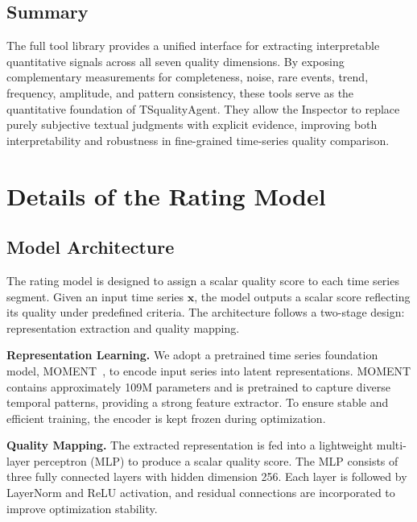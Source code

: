 \documentclass{article}
\begin{document}
\subsection{Summary}

The full tool library provides a unified interface for extracting interpretable quantitative signals across all seven quality dimensions. By exposing complementary measurements for completeness, noise, rare events, trend, frequency, amplitude, and pattern consistency, these tools serve as the quantitative foundation of TSqualityAgent. They allow the Inspector to replace purely subjective textual judgments with explicit evidence, improving both interpretability and robustness in fine-grained time-series quality comparison.



\section{Details of the Rating Model}
\label{app:rating_model}



\subsection{Model Architecture}
\label{app:model_arch}
The rating model is designed to assign a scalar quality score to each time series segment. Given an input time series $\mathbf{x}$, the model outputs a scalar score reflecting its quality under predefined criteria. The architecture follows a two-stage design: representation extraction and quality mapping.

\textbf{Representation Learning.}
We adopt a pretrained time series foundation model, MOMENT~\citep{goswami2024moment}, to encode input series into latent representations. MOMENT contains approximately 109M parameters and is pretrained to capture diverse temporal patterns, providing a strong feature extractor. To ensure stable and efficient training, the encoder is kept frozen during optimization.

\textbf{Quality Mapping.}
The extracted representation is fed into a lightweight multi-layer perceptron (MLP) to produce a scalar quality score. The MLP consists of three fully connected layers with hidden dimension 256. Each layer is followed by LayerNorm and ReLU activation, and residual connections are incorporated to improve optimization stability.
\end{document}
